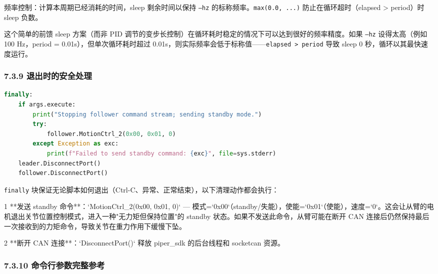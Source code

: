 \documentclass[UTF8,a4paper,11pt]{ctexart}
\begin{document}
{频率控制：计算本周期已经消耗的时间，sleep 剩余时间以保持 \texttt{--hz} 的标称频率。\texttt{max(0.0, ...)} 防止在循环超时（elapsed > period）时 sleep 负数。

这个简单的前馈 sleep 方案（而非 PID 调节的变步长控制）在循环耗时稳定的情况下可以达到很好的频率精度。如果 \texttt{--hz} 设得太高（例如 100 Hz，period = 0.01s），但单次循环耗时超过 0.01s，则实际频率会低于标称值——\texttt{elapsed > period} 导致 sleep 0 秒，循环以其最快速度运行。

\subsubsection{7.3.9 退出时的安全处理}

\begin{lstlisting}[language=python]
finally:
    if args.execute:
        print("Stopping follower command stream; sending standby mode.")
        try:
            follower.MotionCtrl_2(0x00, 0x01, 0)
        except Exception as exc:
            print(f"Failed to send standby command: {exc}", file=sys.stderr)
    leader.DisconnectPort()
    follower.DisconnectPort()
\end{lstlisting}

\texttt{finally} 块保证无论脚本如何退出（Ctrl-C、异常、正常结束），以下清理动作都会执行：

\item[1] **发送 standby 命令**：`MotionCtrl_2(0x00, 0x01, 0)` — 模式=`0x00`（standby/失能），使能=`0x01`（使能），速度=`0`。这会让从臂的电机退出关节位置控制模式，进入一种"无力矩但保持位置"的 standby 状态。如果不发送此命令，从臂可能在断开 CAN 连接后仍然保持最后一次接收到的力矩命令，导致关节在重力作用下缓慢下坠。
\item[2] **断开 CAN 连接**：`DisconnectPort()` 释放 piper_sdk 的后台线程和 socketcan 资源。

\subsubsection{7.3.10 命令行参数完整参考}

}
\end{document}
